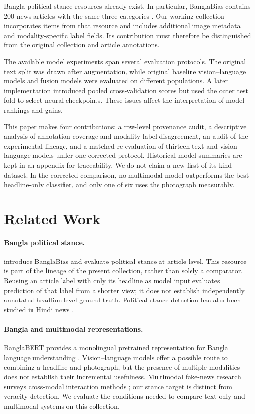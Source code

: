 \documentclass[11pt]{article}
\begin{document}
Bangla political stance resources already exist. In particular, BanglaBias contains 200 news articles with the same three categories \citep{lia2025read}. Our working collection incorporates items from that resource and includes additional image metadata and modality-specific label fields. Its contribution must therefore be distinguished from the original collection and article annotations.

The available model experiments span several evaluation protocols. The original text split was drawn after augmentation, while original baseline vision--language models and fusion models were evaluated on different populations. A later implementation introduced pooled cross-validation scores but used the outer test fold to select neural checkpoints. These issues affect the interpretation of model rankings and gains.

This paper makes four contributions: a row-level provenance audit, a descriptive analysis of annotation coverage and modality-label disagreement, an audit of the experimental lineage, and a matched re-evaluation of thirteen text and vision--language models under one corrected protocol. Historical model summaries are kept in an appendix for traceability. We do not claim a new first-of-its-kind dataset. In the corrected comparison, no multimodal model outperforms the best headline-only classifier, and only one of six uses the photograph measurably.

\section{Related Work}
\paragraph{Bangla political stance.}
\citet{lia2025read} introduce BanglaBias and evaluate political stance at article level. This resource is part of the lineage of the present collection, rather than solely a comparator. Reusing an article label with only its headline as model input evaluates prediction of that label from a shorter view; it does not establish independently annotated headline-level ground truth. Political stance detection has also been studied in Hindi news \citep{agrawal2022hindi}.

\paragraph{Bangla and multimodal representations.}
BanglaBERT provides a monolingual pretrained representation for Bangla language understanding \citep{bhattacharjee2022banglabert}. Vision--language models offer a possible route to combining a headline and photograph, but the presence of multiple modalities does not establish their incremental usefulness. Multimodal fake-news research surveys cross-modal interaction methods \citep{li2025survey}; our stance target is distinct from veracity detection. We evaluate the conditions needed to compare text-only and multimodal systems on this collection.
\end{document}
